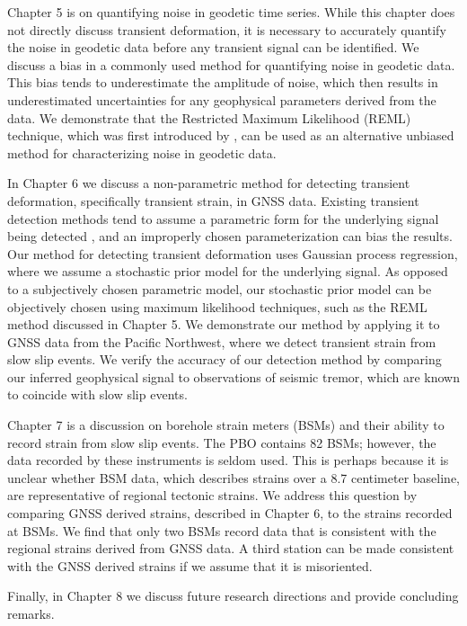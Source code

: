 Chapter 5 is on quantifying noise in geodetic time series.  While this
chapter does not directly discuss transient deformation, it is
necessary to accurately quantify the noise in geodetic data before any
transient signal can be identified. We discuss a bias in a commonly
used method for quantifying noise in geodetic data. This bias tends to
underestimate the amplitude of noise, which then results in
underestimated uncertainties for any geophysical parameters derived
from the data. We demonstrate that the Restricted Maximum Likelihood
(REML) technique, which was first introduced by \citet{Patterson1971},
can be used as an alternative unbiased method for characterizing noise
in geodetic data.

In Chapter 6 we discuss a non-parametric method for detecting
transient deformation, specifically transient strain, in GNSS data.
Existing transient detection methods tend to assume a parametric form
for the underlying signal being detected \citep[e.g.,][]{Ohtani2010},
and an improperly chosen parameterization can bias the results. Our
method for detecting transient deformation uses Gaussian process
regression, where we assume a stochastic prior model for the
underlying signal. As opposed to a subjectively chosen parametric
model, our stochastic prior model can be objectively chosen using
maximum likelihood techniques, such as the REML method discussed in
Chapter 5. We demonstrate our method by applying it to GNSS data from
the Pacific Northwest, where we detect transient strain from slow slip
events. We verify the accuracy of our detection method by comparing
our inferred geophysical signal to observations of seismic tremor,
which are known to coincide with slow slip events.

Chapter 7 is a discussion on borehole strain meters (BSMs) and their
ability to record strain from slow slip events. The PBO contains 82
BSMs; however, the data recorded by these instruments is seldom used.
This is perhaps because it is unclear whether BSM data, which
describes strains over a 8.7 centimeter baseline, are representative
of regional tectonic strains. We address this question by comparing
GNSS derived strains, described in Chapter 6, to the strains recorded
at BSMs. We find that only two BSMs record data that is consistent
with the regional strains derived from GNSS data. A third station can
be made consistent with the GNSS derived strains if we assume that it
is misoriented.

Finally, in Chapter 8 we discuss future research directions and
provide concluding remarks.

